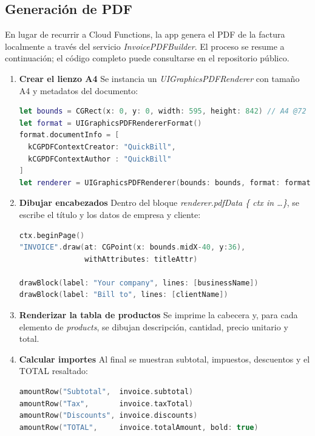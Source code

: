 \subsection{Generación de PDF}

\begin{large}

En lugar de recurrir a Cloud Functions, la app genera el PDF de la factura localmente a través del servicio \textit{InvoicePDFBuilder}. El proceso se resume a continuación; el código completo puede consultarse en el repositorio público.

\begin{enumerate}
  \item \textbf{Crear el lienzo A4}\newline
  Se instancia un \textit{UIGraphicsPDFRenderer} con tamaño A4 y metadatos del documento:
  \begin{lstlisting}[language=swift, basicstyle=\ttfamily\small, caption={Creación del lienzo A4}]
let bounds = CGRect(x: 0, y: 0, width: 595, height: 842) // A4 @72 dpi
let format = UIGraphicsPDFRendererFormat()
format.documentInfo = [
  kCGPDFContextCreator: "QuickBill",
  kCGPDFContextAuthor : "QuickBill"
]
let renderer = UIGraphicsPDFRenderer(bounds: bounds, format: format)
  \end{lstlisting}

  \item \textbf{Dibujar encabezados}\newline
  Dentro del bloque \textit{renderer.pdfData \{ ctx in …\}}, se escribe el título y los datos de empresa y cliente:
  \begin{lstlisting}[language=swift, basicstyle=\ttfamily\small, caption={Dibujar encabezados}]
ctx.beginPage()
"INVOICE".draw(at: CGPoint(x: bounds.midX-40, y:36),
               withAttributes: titleAttr)

drawBlock(label: "Your company", lines: [businessName])
drawBlock(label: "Bill to", lines: [clientName])
  \end{lstlisting}

  \item \textbf{Renderizar la tabla de productos}\newline
  Se imprime la cabecera y, para cada elemento de \textit{products}, se dibujan descripción, cantidad, precio unitario y total.

  \item \textbf{Calcular importes}\newline
  Al final se muestran subtotal, impuestos, descuentos y el TOTAL resaltado:
  \begin{lstlisting}[language=swift, basicstyle=\ttfamily\small, caption={Calcular importes}]
amountRow("Subtotal",  invoice.subtotal)
amountRow("Tax",       invoice.taxTotal)
amountRow("Discounts", invoice.discounts)
amountRow("TOTAL",     invoice.totalAmount, bold: true)
  \end{lstlisting}


\end{enumerate}
\end{large}
